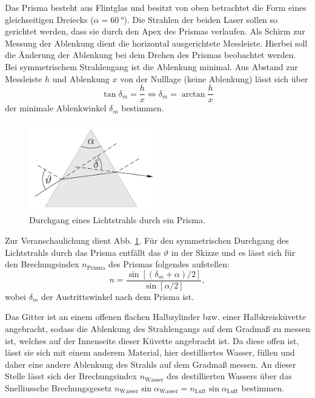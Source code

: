 			Das Prisma besteht aus Flintglas und besitzt von oben betrachtet die Form eines gleichseitigen Dreiecks ($\alpha = \SI{60}{\degree}$).
			Die Strahlen der beiden Laser sollen so gerichtet werden, dass sie durch den Apex des Prismas verlaufen. 
			Als Schirm zur Messung der Ablenkung dient die horizontal ausgerichtete Messleiste.
			Hierbei soll die Änderung der Ablenkung bei dem Drehen des Prismas beobachtet werden.
			Bei symmetrischem Strahlengang ist die Ablenkung minimal.
			Aus Abstand zur Messleiste $h$ und Ablenkung $x$ von der Nulllage (keine Ablenkung) lässt sich über
			\begin{equation} \label{eq:Winkler}
				\tan \delta_m = \frac{h}{x} \Leftrightarrow \delta_m = \arctan \frac{h}{x}
			\end{equation}
			der minimale Ablenkwinkel $\delta_m$ bestimmen.
			\begin{figure}[ht]
				\centering
				\includegraphics[width=0.5\textwidth]{bilder/prisma.png}
				\caption{Durchgang eines Lichtstrahls durch ein Prisma.\cite{WWU}}
				\label{fig:Prisma}	
			\end{figure}
			Zur Veranschaulichung dient Abb. \ref{fig:Prisma}.
			Für den symmetrischen Durchgang des Lichtstrahls durch das Prisma entfällt das $\vartheta$ in der Skizze und  es lässt sich für den Brechungsindex $n_\text{Prisma}$ des Prismas folgendes aufstellen:
			\begin{equation} \label{eq:nPrisma}
				n = \frac{\sin[(\delta_m + \alpha) / 2]}{\sin [\alpha / 2]},
			\end{equation} 
			wobei $\delta_m$ der Austrittswinkel nach dem Prisma ist.
			
			Das Gitter ist an einem offenen flachen Halbzylinder bzw. einer Halbkreisküvette angebracht, sodass die Ablenkung des Strahlengangs auf dem Gradmaß zu messen ist, welches auf der Innenseite dieser Küvette angebracht ist.
			Da diese offen ist, lässt sie sich mit einem anderem Material, hier destilliertes Wasser, füllen und daher eine andere Ablenkung des Strahls auf dem Gradmaß messen.
			An dieser Stelle lässt sich der Brechungsindex $n_\text{Wasser}$ des destillierten Wassers über das Snelliussche Brechungsgesetz $n_\text{Wasser} \sin \alpha_\text{Wasser} = n_\text{Luft} \sin \alpha_\text{Luft}$ bestimmen.
			
